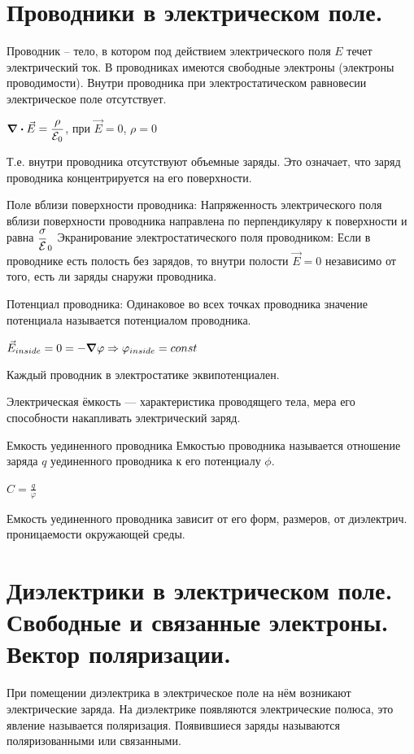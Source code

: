 \documentclass[12pt]{report}
\begin{document}
\section{Проводники в электрическом поле.}
Проводник – тело, в котором под действием электрического поля $E$ течет электрический ток. В проводниках имеются свободные электроны (электроны проводимости).  Внутри проводника при электростатическом равновесии электрическое поле отсутствует.
\begin{center}
    $\div\vec{E} = \dfrac{\rho}{\varE_0}$, при $\vec{E} = 0$, $\rho = 0$
\end{center}

Т.е. внутри проводника отсутствуют
объемные заряды. Это означает, что заряд проводника концентрируется
на его поверхности.

Поле вблизи поверхности проводника: Напряженность электрического поля вблизи поверхности проводника направлена по перпендикуляру к поверхности и равна $\dfrac{\sigma}{\varE}_0$ Экранирование электростатического поля проводником: Если в проводнике есть полость без зарядов, то внутри полости $\vec{E} = 0$ независимо от того, есть ли заряды снаружи проводника.

Потенциал проводника: Одинаковое во всех точках проводника значение потенциала называется потенциалом проводника.
\begin{center}
    $\vec{E}_{inside} = 0 = -\grad \varphi \Rightarrow \varphi_{inside} = const$
\end{center}

Каждый проводник в электростатике
эквипотенциален.

Электрическая ёмкость --- характеристика проводящего тела, мера его способности накапливать электрический заряд.

Емкость уединенного проводника Емкостью проводника называется отношение заряда $q$ уединенного проводника к его потенциалу $\phi$.

\begin{center}
    $C = \frac{q}{\varphi}$
\end{center}

Емкость уединенного проводника зависит от его форм, размеров, от диэлектрич.  проницаемости окружающей среды.

\setcounter{section}{12}
\section{Диэлектрики в электрическом поле. Свободные и связанные электроны. Вектор поляризации.}
При помещении диэлектрика в электрическое поле на нём возникают электрические заряда. На диэлектрике появляются электрические полюса, это явление называется поляризация. Появившиеся заряды называются поляризованными или связанными.
\end{document}
